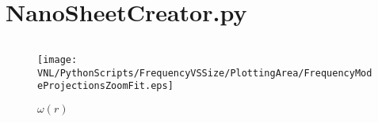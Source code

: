 
\appendix
\appendixpage
\addappheadtotoc
\section{NanoSheetCreator.py}
\label{NSCstart}
\inputminted[python3=true,bgcolor=Black,linenos=true]{python}{VNL/PythonScripts/NanoSheetCreator.py}
\label{NSCend}
\begin{figure}
  \texttt{[image: VNL/PythonScripts/FrequencyVSSize/PlottingArea/FrequencyModeProjectionsZoomFit.eps]}
  \caption{$\omega(r)$}
  \label{OR}
\end{figure}
\newpage
